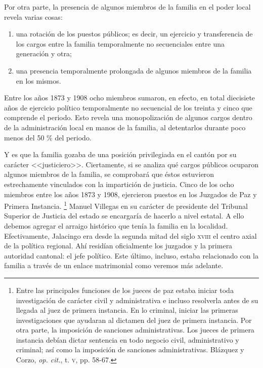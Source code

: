 \documentclass[14pt,twoside,final]{extbook} %
\let\oldfootnote\footnote
\renewcommand\footnote[1]{%
\oldfootnote{\hspace{1mm}#1}}
\begin{document}
Por otra parte, la presencia de algunos miembros de la familia en el poder local revela varias cosas:
\begin{enumerate}[noitemsep]
\item una rotación de los puestos públicos; es decir, un ejercicio y transferencia de los cargos entre la familia temporalmente no secuenciales entre una generación y otra; 
\item una presencia temporalmente prolongada de algunos miembros de la familia en los mismos.
\end{enumerate}
Entre los años 1873 y 1908 ocho miembros sumaron, en efecto, en total diecisiete años de ejercicio político temporalmente no secuencial de los treinta y cinco que comprende el periodo. Esto revela una monopolización de algunos cargos dentro de la administración local en manos de la familia, al detentarlos durante poco menos del 50 \% del periodo.

Y es que la familia gozaba de una posición privilegiada en el cantón por su carácter <<justiciero>>. Ciertamente, si se analiza qué cargos públicos ocuparon algunos miembros de la familia, se comprobará que éstos estuvieron estrechamente vinculados con la impartición de justicia. Cinco de los ocho miembros entre los años 1873 y 1908, ejercieron puestos en los Juzgados de Paz y Primera Instancia.\footnote{Entre las principales funciones de los jueces de paz estaba iniciar toda investigación de carácter civil y administrativa e incluso resolverla antes de su llegada al juez de primera instancia. En lo criminal, iniciar las primeras investigaciones que ayudaran al dictamen del juez de primera instancia. Por otra parte, la imposición de sanciones administrativas. Los jueces de primera instancia debían dictar sentencia en todo negocio civil, administrativo y criminal; así como la imposición de sanciones administrativas. Blázquez y Corzo, \emph{op. cit.}, t. \textsc{v}, pp. 58-67.} Manuel Villegas en su carácter de presidente del Tribunal Superior de Justicia del estado se encargaría de hacerlo a nivel estatal. A ello debemos agregar el arraigo histórico que tenía la familia en la localidad. Efectivamente, Jalacingo era desde la segunda mitad del siglo \textsc{xviii} el centro axial de la política regional. Ahí residían oficialmente los juzgados y la primera autoridad cantonal: el jefe político. Este último, incluso, estaba relacionado con la familia a través de un enlace matrimonial como veremos más adelante.
\end{document}
